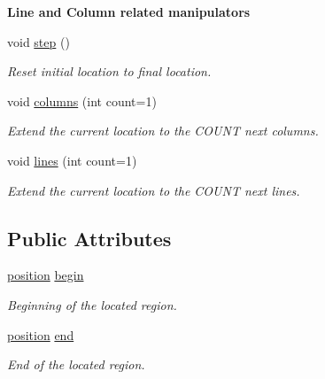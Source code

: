 \begin{Indent}\textbf{ Line and Column related manipulators}\par
\begin{DoxyCompactItemize}
\item 
\mbox{\label{classyy_1_1location_a96620cec8dd8ebfc96c60a03c10154d0}} 
void \hyperlink{classyy_1_1location_a96620cec8dd8ebfc96c60a03c10154d0}{step} ()
\begin{DoxyCompactList}\small\item\em Reset initial location to final location. \end{DoxyCompactList}\item 
\mbox{\label{classyy_1_1location_ae232b2eb7ad3aed7f5c2b080d64d931d}} 
void \hyperlink{classyy_1_1location_ae232b2eb7ad3aed7f5c2b080d64d931d}{columns} (int count=1)
\begin{DoxyCompactList}\small\item\em Extend the current location to the C\+O\+U\+NT next columns. \end{DoxyCompactList}\item 
\mbox{\label{classyy_1_1location_aca7f94cd71a67d27f1c90e54d8cd4ff6}} 
void \hyperlink{classyy_1_1location_aca7f94cd71a67d27f1c90e54d8cd4ff6}{lines} (int count=1)
\begin{DoxyCompactList}\small\item\em Extend the current location to the C\+O\+U\+NT next lines. \end{DoxyCompactList}\end{DoxyCompactItemize}
\end{Indent}
\subsection*{Public Attributes}
\begin{DoxyCompactItemize}
\item 
\mbox{\label{classyy_1_1location_a70540e90479a85db4112b552d7e032cf}} 
\hyperlink{classyy_1_1position}{position} \hyperlink{classyy_1_1location_a70540e90479a85db4112b552d7e032cf}{begin}
\begin{DoxyCompactList}\small\item\em Beginning of the located region. \end{DoxyCompactList}\item 
\mbox{\label{classyy_1_1location_aa9be2a89fdb63da08167ebd4b819addd}} 
\hyperlink{classyy_1_1position}{position} \hyperlink{classyy_1_1location_aa9be2a89fdb63da08167ebd4b819addd}{end}
\begin{DoxyCompactList}\small\item\em End of the located region. \end{DoxyCompactList}\end{DoxyCompactItemize}


